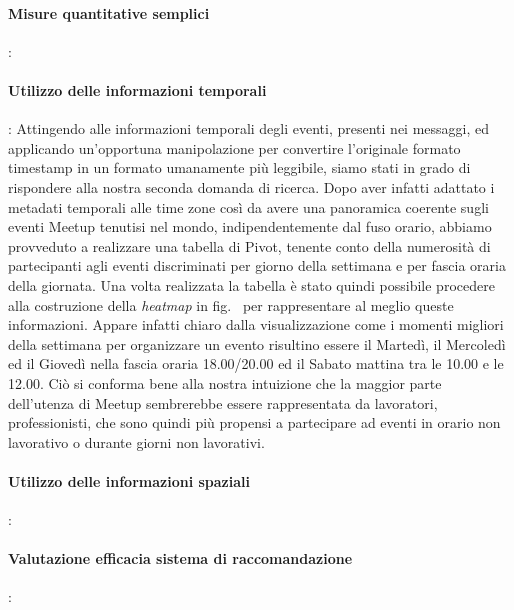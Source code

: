 \documentclass[fleqn,10pt]{SelfArx} %
\begin{document}
\paragraph{Misure quantitative semplici}:
\paragraph{Utilizzo delle informazioni temporali}:
Attingendo alle informazioni temporali degli eventi, presenti nei messaggi, ed applicando un'opportuna manipolazione per convertire l'originale formato timestamp in un formato umanamente più leggibile, siamo stati in grado di rispondere alla nostra seconda domanda di ricerca. Dopo aver infatti adattato i metadati temporali alle time zone così da avere una panoramica coerente sugli eventi Meetup tenutisi nel mondo, indipendentemente dal fuso orario, abbiamo provveduto a realizzare una tabella di Pivot, tenente conto della numerosità di partecipanti agli eventi discriminati per giorno della settimana e per fascia oraria della giornata. Una volta realizzata la tabella è stato quindi possibile procedere alla costruzione della \textit{heatmap} in fig.~ %
per rappresentare al meglio queste informazioni. Appare infatti chiaro dalla visualizzazione come i momenti migliori della settimana per organizzare un evento risultino essere il Martedì, il Mercoledì ed il Giovedì nella fascia oraria 18.00/20.00 ed il Sabato mattina tra le 10.00 e le 12.00. Ciò si conforma bene alla nostra intuizione che la maggior parte dell'utenza di Meetup sembrerebbe essere rappresentata da lavoratori, professionisti, che sono quindi più propensi a partecipare ad eventi in orario non lavorativo o durante giorni non lavorativi.
\paragraph{Utilizzo delle informazioni spaziali}:
\paragraph{Valutazione efficacia sistema di raccomandazione}:
\end{document}
